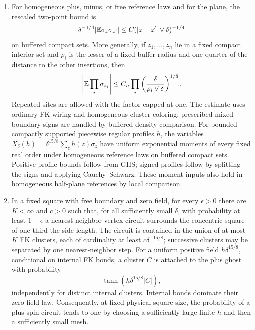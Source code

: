 \begin{proposition}
\begin{enumerate}
plane-centered scalar energy are nonzero.
\item\label{in:fields-moments}
For homogeneous plus, minus, or free reference laws and for the plane,
the rescaled two-point bound is
\[
 \delta^{-1/4}|\mathbb E\sigma_z\sigma_{z'}|
 \leq C(|z-z'|\vee\delta)^{-1/4}
\]
on buffered compact sets. More generally, if $z_1,\ldots,z_n$ lie in
a fixed compact interior set and
$\rho_i$ is the lesser of a fixed buffer radius and one quarter of
the distance to the other insertions, then
\begin{equation}\label{in:product-arm}
 \left|\mathbb E\prod_i\sigma_{z_i}\right|
 \leq C_n\prod_i
       \left(\frac{\delta}{\rho_i\vee\delta}\right)^{1/8}.
\end{equation}
Repeated sites are allowed with the factor capped at one. The estimate
uses ordinary FK wiring and homogeneous cluster coloring; prescribed
mixed boundary signs are handled by buffered density comparison.
For bounded compactly supported piecewise regular profiles $h$, the
variables
$X_\delta(h)=\delta^{15/8}\sum_z h(z)\sigma_z$
have uniform exponential moments of every fixed real order under
homogeneous reference laws on buffered compact sets. Positive-profile
bounds follow from GHS; signed profiles follow by splitting the signs
and applying Cauchy--Schwarz. These moment inputs also hold in
homogeneous half-plane references by local comparison.
\item\label{in:fields-necklace}
In a fixed square with free boundary and zero field, for every
$\epsilon>0$ there are $K<\infty$ and $c>0$ such that, for all
sufficiently small $\delta$, with probability at least $1-\epsilon$
a nearest-neighbor vertex circuit surrounds the concentric square of
one third the side length. The circuit is contained in the union of
at most $K$ FK clusters, each of cardinality at least
$c\delta^{-15/8}$; successive clusters may be separated by one
nearest-neighbor step. For a uniform positive field
$h\delta^{15/8}$, conditional on internal FK bonds, a cluster $C$
is attached to the plus ghost with probability
\begin{equation}\label{in:ghost}
 \tanh(h\delta^{15/8}|C|),
\end{equation}
independently for distinct internal clusters. Internal bonds dominate
their zero-field law. Consequently, at fixed physical square size,
the probability of a plus-spin circuit tends to one by choosing a
sufficiently large finite $h$ and then a sufficiently small mesh.
\end{enumerate}
\end{proposition}

